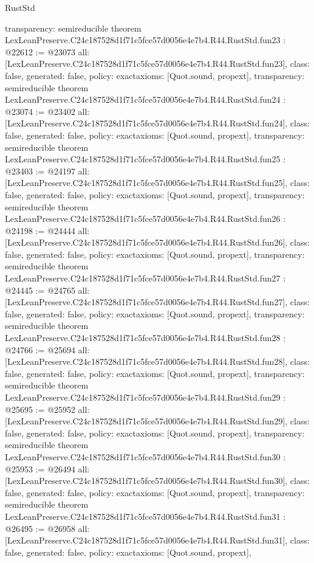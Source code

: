 \begin{lexlean}{RustStd}
\begin{coremodule}
{  transparency: semireducible
}
theorem LexLeanPreserve.C24c187528d1f71c5fce57d0056e4e7b4.R44.RustStd.fun23 : @22612 := @23073 {
  all: [LexLeanPreserve.C24c187528d1f71c5fce57d0056e4e7b4.R44.RustStd.fun23],
  class: false,
  generated: false,
  policy: exact{axioms: [Quot.sound, propext]},
  transparency: semireducible
}
theorem LexLeanPreserve.C24c187528d1f71c5fce57d0056e4e7b4.R44.RustStd.fun24 : @23074 := @23402 {
  all: [LexLeanPreserve.C24c187528d1f71c5fce57d0056e4e7b4.R44.RustStd.fun24],
  class: false,
  generated: false,
  policy: exact{axioms: [Quot.sound, propext]},
  transparency: semireducible
}
theorem LexLeanPreserve.C24c187528d1f71c5fce57d0056e4e7b4.R44.RustStd.fun25 : @23403 := @24197 {
  all: [LexLeanPreserve.C24c187528d1f71c5fce57d0056e4e7b4.R44.RustStd.fun25],
  class: false,
  generated: false,
  policy: exact{axioms: [Quot.sound, propext]},
  transparency: semireducible
}
theorem LexLeanPreserve.C24c187528d1f71c5fce57d0056e4e7b4.R44.RustStd.fun26 : @24198 := @24444 {
  all: [LexLeanPreserve.C24c187528d1f71c5fce57d0056e4e7b4.R44.RustStd.fun26],
  class: false,
  generated: false,
  policy: exact{axioms: [Quot.sound, propext]},
  transparency: semireducible
}
theorem LexLeanPreserve.C24c187528d1f71c5fce57d0056e4e7b4.R44.RustStd.fun27 : @24445 := @24765 {
  all: [LexLeanPreserve.C24c187528d1f71c5fce57d0056e4e7b4.R44.RustStd.fun27],
  class: false,
  generated: false,
  policy: exact{axioms: [Quot.sound, propext]},
  transparency: semireducible
}
theorem LexLeanPreserve.C24c187528d1f71c5fce57d0056e4e7b4.R44.RustStd.fun28 : @24766 := @25694 {
  all: [LexLeanPreserve.C24c187528d1f71c5fce57d0056e4e7b4.R44.RustStd.fun28],
  class: false,
  generated: false,
  policy: exact{axioms: [Quot.sound, propext]},
  transparency: semireducible
}
theorem LexLeanPreserve.C24c187528d1f71c5fce57d0056e4e7b4.R44.RustStd.fun29 : @25695 := @25952 {
  all: [LexLeanPreserve.C24c187528d1f71c5fce57d0056e4e7b4.R44.RustStd.fun29],
  class: false,
  generated: false,
  policy: exact{axioms: [Quot.sound, propext]},
  transparency: semireducible
}
theorem LexLeanPreserve.C24c187528d1f71c5fce57d0056e4e7b4.R44.RustStd.fun30 : @25953 := @26494 {
  all: [LexLeanPreserve.C24c187528d1f71c5fce57d0056e4e7b4.R44.RustStd.fun30],
  class: false,
  generated: false,
  policy: exact{axioms: [Quot.sound, propext]},
  transparency: semireducible
}
theorem LexLeanPreserve.C24c187528d1f71c5fce57d0056e4e7b4.R44.RustStd.fun31 : @26495 := @26958 {
  all: [LexLeanPreserve.C24c187528d1f71c5fce57d0056e4e7b4.R44.RustStd.fun31],
  class: false,
  generated: false,
  policy: exact{axioms: [Quot.sound, propext]},
}
\end{coremodule}
\end{lexlean}
